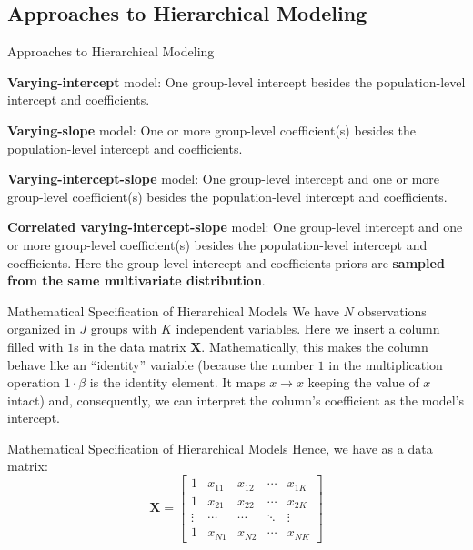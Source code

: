 \subsection{Approaches to Hierarchical Modeling}
\begin{frame}{Approaches to Hierarchical Modeling}
	\begin{vfilleditems}
		\item \textbf{Varying-intercept} model:
		One group-level intercept besides the population-level
		intercept and coefficients.
		\item \textbf{Varying-slope} model:
		One or more group-level coefficient(s) besides the population-level
		intercept and coefficients.
		\item \textbf{Varying-intercept-slope} model:
		One group-level intercept and one or more group-level coefficient(s) besides the population-level
		intercept and coefficients.
		\item \textbf{Correlated varying-intercept-slope} model:
		One group-level intercept and one or more group-level coefficient(s) besides the population-level
		intercept and coefficients.
		Here the group-level intercept and coefficients priors
		are \textbf{sampled from the same multivariate distribution}.
	\end{vfilleditems}
\end{frame}

\begin{frame}{Mathematical Specification of Hierarchical Models}
	We have $N$ observations organized in $J$ groups with $K$ independent variables.
	\vfill
	Here we insert a column filled with $1$s in the data matrix $\mathbf{X}$.
	\vfill
	Mathematically, this makes the column behave like an ``identity'' variable
	(because the number $1$ in the multiplication operation $1 \cdot \beta$ is the identity element.
	It maps $x \to x$ keeping the value of $x$ intact) and, consequently,
	we can interpret the column's coefficient as the model's intercept.
\end{frame}

\begin{frame}{Mathematical Specification of Hierarchical Models}
	Hence, we have as a data matrix:
	$$
		\mathbf{X} =
		\begin{bmatrix}
			1      & x_{11} & x_{12} & \cdots & x_{1K} \\
			1      & x_{21} & x_{22} & \cdots & x_{2K} \\
			\vdots & \cdots & \cdots & \ddots & \vdots \\
			1      & x_{N1} & x_{N2} & \cdots & x_{NK}
		\end{bmatrix}
	$$
\end{frame}

